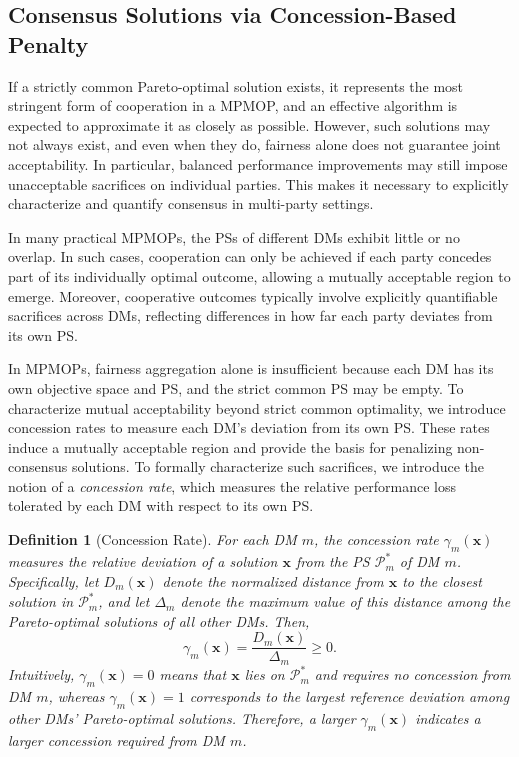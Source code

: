 \documentclass[journal]{IEEEtran}
\newtheorem{definition}{Definition}
\begin{document}
\subsection{Consensus Solutions via Concession-Based Penalty}
If a strictly common Pareto-optimal solution exists, it represents the most stringent form of cooperation in a MPMOP, and an effective algorithm is expected to approximate it as closely as possible. However, such solutions may not always exist, and even when they do, fairness alone does not guarantee joint acceptability. In particular, balanced performance improvements may still impose unacceptable sacrifices on individual parties. This makes it necessary to explicitly characterize and quantify consensus in multi-party settings.

In many practical MPMOPs, the PSs of different DMs exhibit little or no overlap. In such cases, cooperation can only be achieved if each party concedes part of its individually optimal outcome, allowing a mutually acceptable region to emerge. Moreover, cooperative outcomes typically involve explicitly quantifiable sacrifices across DMs, reflecting differences in how far each party deviates from its own PS.

In MPMOPs, fairness aggregation alone is insufficient because each DM has its own objective space and PS, and the strict common PS may be empty. To characterize mutual acceptability beyond strict common optimality, we introduce concession rates to measure each DM's deviation from its own PS. These rates induce a mutually acceptable region and provide the basis for penalizing non-consensus solutions. To formally characterize such sacrifices, we introduce the notion of a \emph{concession rate}, which measures the relative performance loss tolerated by each DM with respect to its own PS.


\begin{definition}[Concession Rate] 
	\label{def:concession_rate} 
		For each DM $m$, the concession rate $\gamma_m(\mathbf{x})$ measures the relative deviation of a solution $\mathbf{x}$ from the PS $\mathcal{P}_m^{*}$ of DM $m$. Specifically, let $D_m(\mathbf{x})$ denote the normalized distance from $\mathbf{x}$ to the closest solution in $\mathcal{P}_m^{*}$, and let $\Delta_m$ denote the maximum value of this distance among the Pareto-optimal solutions of all other DMs. Then, 
		\begin{equation} 
			\gamma_m(\mathbf{x}) = \frac{D_m(\mathbf{x})}{\Delta_m} \geq 0.
		\end{equation} 
		Intuitively, $\gamma_m(\mathbf{x})=0$ means that $\mathbf{x}$ lies on $\mathcal{P}_m^{*}$ and requires no concession from DM $m$, whereas $\gamma_m(\mathbf{x})=1$ corresponds to the largest reference deviation among other DMs' Pareto-optimal solutions. Therefore, a larger $\gamma_m(\mathbf{x})$ indicates a larger concession required from DM $m$. 
\end{definition}
	
\end{document}

